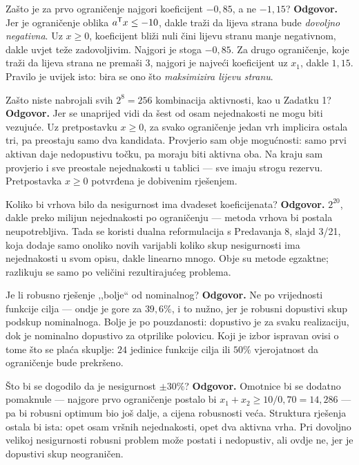 \begin{pitanje}{Zašto je za prvo ograničenje najgori koeficijent $-0{,}85$, a ne $-1{,}15$?}
\textbf{Odgovor.} Jer je ograničenje oblika $a^{\mathsf{T}} x \leq -10$, dakle traži da
lijeva strana bude \emph{dovoljno negativna}. Uz $x \geq 0$, koeficijent bliži
nuli čini lijevu stranu manje negativnom, dakle uvjet teže zadovoljivim. Najgori
je stoga $-0{,}85$. Za drugo ograničenje, koje traži da lijeva strana ne
premaši $3$, najgori je najveći koeficijent uz $x_1$, dakle $1{,}15$. Pravilo je
uvijek isto: bira se ono što \emph{maksimizira lijevu stranu}.
\end{pitanje}

\begin{pitanje}{Zašto niste nabrojali svih $2^8 = 256$ kombinacija aktivnosti, kao u Zadatku 1?}
\textbf{Odgovor.} Jer se unaprijed vidi da šest od osam nejednakosti ne mogu biti
vezujuće. Uz pretpostavku $x \geq 0$, za svako ograničenje jedan vrh implicira
ostala tri, pa preostaju samo dva kandidata. Provjerio sam obje mogućnosti:
samo prvi aktivan daje nedopustivu točku, pa moraju biti aktivna oba. Na kraju
sam provjerio i sve preostale nejednakosti u tablici --- sve imaju strogu
rezervu. Pretpostavka $x \geq 0$ potvrđena je dobivenim rješenjem.
\end{pitanje}

\begin{pitanje}{Koliko bi vrhova bilo da nesigurnost ima dvadeset koeficijenata?}
\textbf{Odgovor.} $2^{20}$, dakle preko milijun nejednakosti po ograničenju ---
metoda vrhova bi postala neupotrebljiva. Tada se koristi dualna reformulacija s
Predavanja 8, slajd 3/21, koja dodaje samo onoliko novih varijabli koliko skup
nesigurnosti ima nejednakosti u svom opisu, dakle linearno mnogo. Obje su metode
egzaktne; razlikuju se samo po veličini rezultirajućeg problema.
\end{pitanje}

\begin{pitanje}{Je li robusno rješenje ,,bolje`` od nominalnog?}
\textbf{Odgovor.} Ne po vrijednosti funkcije cilja --- ondje je gore za
$39{,}6\%$, i to nužno, jer je robusni dopustivi skup podskup nominalnoga. Bolje
je po pouzdanosti: dopustivo je za svaku realizaciju, dok je nominalno dopustivo
za otprilike polovicu. Koji je izbor ispravan ovisi o tome što se plaća skuplje:
$24$ jedinice funkcije cilja ili $50\%$ vjerojatnost da ograničenje bude
prekršeno.
\end{pitanje}

\begin{pitanje}{Što bi se dogodilo da je nesigurnost $\pm 30\%$?}
\textbf{Odgovor.} Omotnice bi se dodatno pomaknule --- najgore prvo ograničenje
postalo bi $x_1 + x_2 \geq 10/0{,}70 = 14{,}286$ --- pa bi robusni optimum bio
još dalje, a cijena robusnosti veća. Struktura rješenja ostala bi ista: opet
osam vršnih nejednakosti, opet dva aktivna vrha. Pri dovoljno velikoj
nesigurnosti robusni problem može postati i nedopustiv, ali ovdje ne, jer je
dopustivi skup neograničen.
\end{pitanje}

